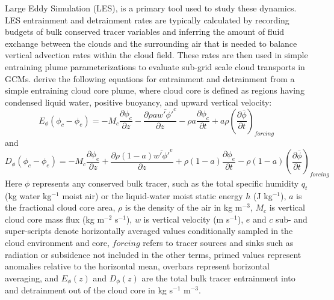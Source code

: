\documentclass[draft,grl]{agutex}
\begin{document}
\begin{article}
Large Eddy Simulation (LES), is a primary tool used to study these dynamics.  
LES entrainment and detrainment rates are typically calculated by recording 
budgets of bulk conserved tracer variables and inferring the amount of fluid 
exchange between the clouds and the surrounding air that is needed to balance 
vertical advection rates within the cloud field.  These rates are then used in 
simple entraining plume parameterizations to evaluate sub-grid scale cloud 
transports in GCMs.  \cite{Siebesma1995} derive the following equations for 
entrainment and detrainment from a simple entraining cloud core plume, where 
cloud core is defined as regions having condensed liquid water, positive 
buoyancy, and upward vertical velocity:
\begin{equation}
  \label{eq:siebesma_entrainment}
    E_{\phi}(\phi_c - \phi_e) = - M_c \frac{\partial \phi_c}{\partial z}
        - \frac{\partial \rho a \overline{w' \phi'}^c}{\partial z}
        - \rho a \frac{\partial \phi_c}{\partial t}
        + a \rho \left(\frac{\partial \bar{\phi}}{\partial t}\right)_{forcing}
\end{equation}
and
\begin{equation}
  \label{eq:siebesma_detrainment}
    D_{\phi}(\phi_c - \phi_e) = - M_c \frac{\partial \phi_e}{\partial z}
        + \frac{\partial \rho (1 - a) \overline{w' \phi'}^e}{\partial z}
        + \rho (1-a) \frac{\partial \phi_e}{\partial t}
     - \rho (1-a) \left(\frac{\partial \bar{\phi}}{\partial t}\right)_{forcing}
\end{equation}
Here $\phi$ represents any conserved bulk tracer, such as the total specific 
humidity $q_t$ (kg water kg$^{-1}$ moist air) or the liquid-water moist static 
energy $h$ (J kg$^{-1}$), $a$ is the fractional cloud core area, $\rho$ is the 
density of the air in kg m$^{-3}$, $M_c$ is vertical cloud core mass flux 
(kg m$^{-2}$ s$^{-1}$), $w$ is vertical velocity (m s$^{-1}$), $e$ and $c$ sub- 
and super-scripts denote horizontally averaged values conditionally sampled in 
the cloud environment and core, $forcing$ refers to tracer sources and sinks
such as radiation or subsidence not included in the other terms, primed values 
represent anomalies relative to the horizontal mean, overbars represent 
horizontal averaging, and $E_{\phi}(z)$ and $D_{\phi}(z)$ are the total bulk 
tracer entrainment into and detrainment out of the cloud core in 
kg s$^{-1}$ m$^{-3}$.  


\end{article}
\end{document}
